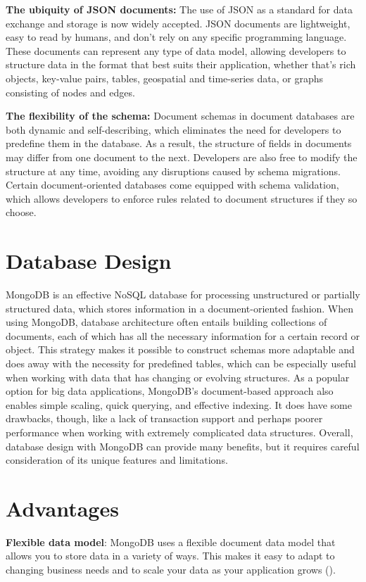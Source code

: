 \textbf{The ubiquity of JSON documents:} The use of JSON as a standard for data exchange and storage is now widely accepted. JSON documents are lightweight, easy to read by humans, and don't rely on any specific programming language. These documents can represent any type of data model, allowing developers to structure data in the format that best suits their application, whether that's rich objects, key-value pairs, tables, geospatial and time-series data, or graphs consisting of nodes and edges.

\textbf{The flexibility of the schema:} Document schemas in document databases are both dynamic and self-describing, which eliminates the need for developers to predefine them in the database. As a result, the structure of fields in documents may differ from one document to the next. Developers are also free to modify the structure at any time, avoiding any disruptions caused by schema migrations. Certain document-oriented databases come equipped with schema validation, which allows developers to enforce rules related to document structures if they so choose.






\section{Database Design}
MongoDB is an effective NoSQL database for processing unstructured or partially structured data, which stores information in a document-oriented fashion. When using MongoDB, database architecture often entails building collections of documents, each of which has all the necessary information for a certain record or object. This strategy makes it possible to construct schemas more adaptable and does away with the necessity for predefined tables, which can be especially useful when working with data that has changing or evolving structures. As a popular option for big data applications, MongoDB's document-based approach also enables simple scaling, quick querying, and effective indexing. It does have some drawbacks, though, like a lack of transaction support and perhaps poorer performance when working with extremely complicated data structures. Overall, database design with MongoDB can provide many benefits, but it requires careful consideration of its unique features and limitations.


\section{Advantages}
\textbf{Flexible data model}: MongoDB uses a flexible document data model that allows you to store data in a variety of ways. This makes it easy to adapt to changing business needs and to scale your data as your application grows (\cites{mongodb-datamodels}{knowledgenile-pro-con}). 

